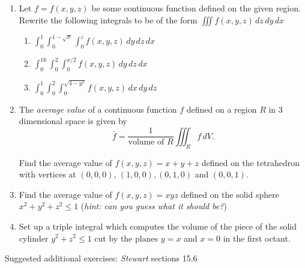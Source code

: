 \documentclass[12pt]{article}
\numberwithin{equation}{subsection}
\numberwithin{figure}{subsection}
\theoremstyle{note}
\begin{document}
{\begin{enumerate}[label=\arabic*.]
\begin{enumerate}
	\item $\displaystyle \iiint_R xy \sin(z)\,dV$ \quad $R$ is the box defined by $0\leq x \leq 1, 0\leq y \leq 2, 0 \leq z \leq \pi/2$
	\item $\displaystyle \iiint_R x \,dV$ \quad  \quad $R$ the solid enclosed by $z=x$ and $x=1-y^2$ above the $xy$-plane
	\item $\displaystyle \iiint_R (x+y+z)\,dV$ \quad $R$ the solid enclosed by $x^2+y^2+z^2=1$ in the first octant
	\item $\displaystyle \iiint_R (2y-z)\,dV$ \quad $R$ the solid enclosed by paraboloids $z=1-x^2-y^2$ and $z=x^2+y^2-1$.
\end{enumerate}

\item Let $f=f(x,y,z)$ be some continuous function defined on the given region. Rewrite the following integrals to be of the form $\iiint f(x,y,z)\,dz\,dy\,dx$

\begin{enumerate}
	\item $\displaystyle \int_0^1 \int_0^{1-\sqrt{x}} \int_0^z f(x,y,z) \,dy\,dz\,dx$
	\item $\displaystyle \int_0^{16} \int_0^2 \int_0^{x/2} f(x,y,z) \,dy\,dz\,dx$
	\item $\displaystyle \int_0^1 \int_0^2 \int_0^{\sqrt{4-y^2}}f(x,y,z)\,dx\,dy\,dz$
\end{enumerate}

\item The \textit{average value} of a continuous function $f$ defined on a region $R$ in 3 dimensional space is given by \[ \bar{f}= \dfrac{1}{\text{volume of $R$}} \iiint_R f\,dV.\]

Find the average value of $f(x,y,z)=x+y+z$ defined on the tetrahedron with vertices at $(0,0,0)$, $(1,0,0), (0,1,0)$ and $(0,0,1)$.

\item Find the average value of $f(x,y,z)=xyz$ defined on the solid sphere $x^2+y^2+z^2\leq 1$ (\textit{hint: can you guess what it should be?})

\item Set up a triple integral which computes the volume of the piece of the solid cylinder $y^2+z^2\leq 1$ cut by the planes $y=x$ and $x=0$ in the first octant. 
\end{enumerate}

Suggested additional exercises: \textit{Stewart} sections 15.6

}
\end{document}
